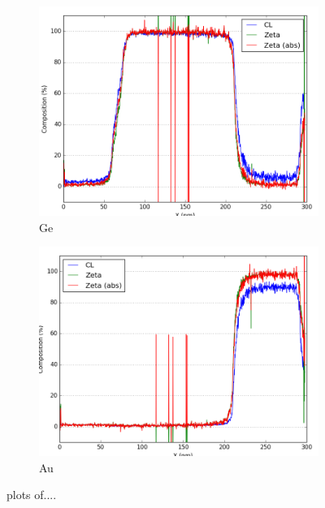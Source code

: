\begin{figure}
\hfill
	\begin{subfigure}{.5\textwidth}
		\centering
		\includegraphics[width=\linewidth]{fig/q-new/oldzetas_Sb_Ge_La}
		\caption{Ge}
		\label{fig:zeta_area2_ge}
	\end{subfigure}%
\hfill
	\begin{subfigure}{.5\textwidth}
		\centering
		\includegraphics[width=\linewidth]{fig/q-new/oldzetas_Sb_Au_Ma}
		\caption{Au}
		\label{fig:zeta_area2_au}
	\end{subfigure}
	\caption{plots of....}
	\label{fig:zeta_area2}
\end{figure}


